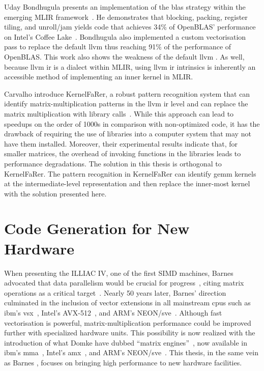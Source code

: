 \documentclass[\main/thesis.tex]{subfiles}
\begin{document}
Uday Bondhugula presents an implementation of the \gls{blas} strategy within the emerging MLIR framework~\autocite{bondhugula2020high}.
He demonstrates that blocking, packing, register tiling, and unroll/jam yields code that achieves 34\% of OpenBLAS' performance on Intel's Coffee Lake~\autocite{bondhugula2020high}.
Bondhugula also implemented a custom \gls{vectorisation} pass to replace the default \gls{llvm}  thus reaching 91\% of the performance of OpenBLAS.
This work also shows the weakness of the default \gls{llvm} .
As well, because \gls{llvm} \gls{ir} is a dialect within MLIR, using \gls{llvm} \gls{ir} \glspl{intrinsic} is inherently an accessible method of implementing an inner kernel in MLIR.

Carvalho \etal introduce KernelFaRer, a robust pattern recognition system that can identify matrix-multiplication patterns in the \gls{llvm} \gls{ir} level and can replace the matrix multiplication with library calls~\autocite{carvalho2021kernelfarer}.
While this approach can lead to speedups on the order of 1000s in comparison with non-optimized code, it has the drawback of requiring the use of libraries into a computer system that may not have them installed.
Moreover, their experimental results indicate that, for smaller matrices, the overhead of invoking functions in the libraries leads to performance degradations.
The solution in this thesis is orthogonal to KernelFaRer.
The pattern recognition in KernelFaRer can identify \gls{gemm} kernels at the intermediate-level representation and then replace the inner-most kernel with the solution presented here.

\section{Code Generation for New Hardware}
When presenting the ILLIAC IV, one of the first SIMD machines, Barnes \etal advocated that data parallelism would be crucial for progress~\autocite{barnes1968illiac}, citing matrix operations as a critical target~\autocite{kuck1968illiac}.
Nearly 50 years later, Barnes' direction culminated in the inclusion of vector extensions in all mainstream \glspl{cpu} such as \gls{ibm}'s \gls{vsx}~\autocite{PowerISA}, Intel's AVX-512~\autocite{IntelISA}, and ARM's NEON/\gls{sve}~\autocite{ArmISA}.
Although fast \gls{vectorisation} is powerful, matrix-multiplication performance could be improved further with specialized hardware units.
This possibility is now realized with the introduction of what Domke \etal have dubbed ``matrix engines''~\autocite{domke2021matrix}, now available in \gls{ibm}'s \gls{mma}~\autocite{PowerISA}, Intel's \gls{amx}~\autocite{IntelISA}, and ARM's NEON/\gls{sve}~\autocite{ArmISA}.
This thesis, in the same vein as Barnes \etal, focuses on bringing high performance to new hardware facilities.
\end{document}
